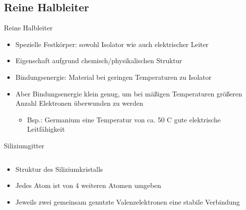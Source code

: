 \documentclass[12pt%
,aspectratio=169%
]{beamer}
\begin{document}
\subsection{Reine Halbleiter}
\begin{frame}{Reine Halbleiter}
\begin{itemize}
	\item Spezielle Festkörper: sowohl Isolator wie auch elektrischer Leiter
	\item Eigenschaft aufgrund chemisch/physikalischen Struktur
	\item Bindungsenergie: Material bei geringen Temperaturen zu Isolator 
	\item Aber Bindungsenergie klein genug, um bei mäßigen Temperaturen größeren Anzahl Elektronen überwunden zu werden
	\begin{itemize}
		\item Bsp.: Germanium eine Temperatur von ca. 50 \textdegree C gute elektrische Leitfähigkeit
	\end{itemize}
\end{itemize}
\end{frame}

\begin{frame}{Siliziumgitter}
\begin{columns}[T] %
\begin{column}{.48\textwidth}
\begin{itemize}
	\item Struktur des Siliziumkristalls
	\item Jedes Atom ist von 4 weiteren Atomen umgeben
	\item Jeweils zwei gemeinsam genutzte Valenzelektronen eine stabile Verbindung
\end{itemize}
\end{column}%
\hfill%
\begin{column}{.48\textwidth}
\end{column}%
\end{columns}
\end{frame}
\end{document}
